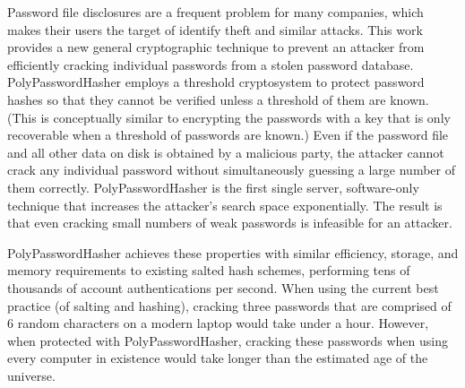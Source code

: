 Password file disclosures are a frequent problem for many companies, which
makes their users the target of identify theft and similar attacks.   
This work provides a new general cryptographic technique to prevent an
attacker from efficiently cracking individual passwords from a stolen
password database.   PolyPasswordHasher employs a threshold cryptosystem to protect
password hashes so that they cannot be verified unless a threshold of them
are known.   (This is conceptually similar to encrypting the passwords with a 
key that is only recoverable when a threshold of passwords are known.)
Even if the password file and all other data on disk is obtained by a 
malicious party, the attacker cannot crack any individual password without 
simultaneously guessing a large number of them correctly.   PolyPasswordHasher
is the first single server, software-only technique that increases
the attacker's search space exponentially.   The result is that even cracking 
small numbers of weak passwords is infeasible for an attacker.   

PolyPasswordHasher achieves these properties with similar efficiency, storage,
and memory requirements to existing salted hash schemes,
performing
tens of thousands of account authentications per second.    
When using the current best practice (of salting and hashing), 
cracking three passwords that are comprised of 6 random characters on
a modern laptop would take under a hour.  However, when protected with
PolyPasswordHasher, cracking these passwords when using every computer in existence
would take longer than the estimated age of the universe.
